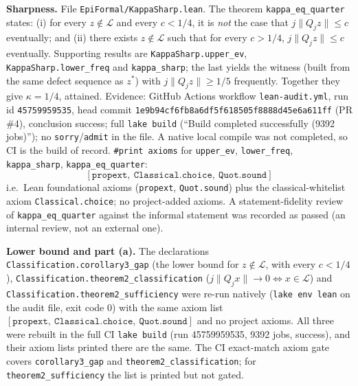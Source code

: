 \documentclass[11pt]{amsart}
\theoremstyle{remark}
\newcommand{\dist}[1]{\lVert #1\rVert}
\newcommand{\LL}{\mathcal{L}}
\begin{document}
\medskip\noindent\textbf{Sharpness.} File \texttt{EpiFormal/KappaSharp.lean}. The theorem
\texttt{kappa\_eq\_quarter} states: (i) for every $z\notin\LL$ and every $c<1/4$,
it is \emph{not} the case that $j\dist{Q_jz}\le c$ eventually; and (ii) there exists $z\notin\LL$ such that
for every $c>1/4$, $j\dist{Q_jz}\le c$ eventually. Supporting results are
\texttt{KappaSharp.upper\_ev}, \texttt{KappaSharp.lower\_freq} and \texttt{kappa\_sharp}; the last
yields the witness (built from the same defect sequence as $z^*$) with $j\dist{Q_jz}\ge1/5$ frequently.
Together they give $\kappa=1/4$, attained. Evidence: GitHub Actions workflow
\texttt{lean-audit.yml}, run id \texttt{45759959535}, head commit
\texttt{1e9b94cf6fb8a6df5f618505f8888d45e6a611ff} (PR \#4), conclusion success; full \texttt{lake build}
(``Build completed successfully (9392 jobs)''); no \texttt{sorry}/\texttt{admit} in the file. A native local
compile was not completed, so CI is the build of record. \texttt{\#print axioms} for
\texttt{upper\_ev}, \texttt{lower\_freq}, \texttt{kappa\_sharp}, \texttt{kappa\_eq\_quarter}:
\[
[\texttt{propext},\ \texttt{Classical.choice},\ \texttt{Quot.sound}]
\]
i.e.\ Lean foundational axioms (\texttt{propext}, \texttt{Quot.sound}) plus the classical-whitelist
axiom \texttt{Classical.choice}; no project-added axioms. A statement-fidelity review of
\texttt{kappa\_eq\_quarter} against the informal statement was recorded as passed (an internal review,
not an external one).

\medskip\noindent\textbf{Lower bound and part (a).} The declarations
\texttt{Classification.corollary3\_gap} (the lower bound for $z\notin\LL$, with every $c<1/4$),
\texttt{Classification.theorem2\_classification}
($j\dist{Q_jx}\to0\iff x\in\LL$) and \texttt{Classification.theorem2\_sufficiency} were re-run
natively (\texttt{lake env lean} on the audit file, exit code $0$) with the same axiom list
$[\texttt{propext},\ \texttt{Classical.choice},\ \texttt{Quot.sound}]$ and no project axioms.
All three were rebuilt in the full CI \texttt{lake build} (run 45759959535, 9392 jobs, success), and their axiom lists printed there are the same. The CI exact-match axiom gate covers \texttt{corollary3\_gap} and \texttt{theorem2\_classification}; for \texttt{theorem2\_sufficiency} the list is printed but not gated.
\end{document}
